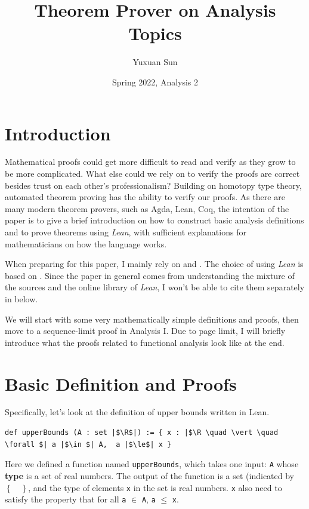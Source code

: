 \documentclass[a4paper]{article}
\title{Theorem Prover on Analysis Topics}
\date{Spring 2022, Analysis 2}
\author{Yuxuan Sun}
\newcommand{\R}{\mathbb{R}}
\theoremstyle{bfnote} %
\theoremstyle{bfnote}                  %
\theoremstyle{example}                       %
\theoremstyle{remark}                       %
\numberwithin{equation}{section}
\begin{document}
\maketitle
\tableofcontents

\section{Introduction}
Mathematical proofs could get more difficult to read and verify as they grow to be more complicated. What else could we rely on to verify the proofs are correct besides trust on each other's professionalism? Building on homotopy type theory, automated theorem proving has the ability to verify our proofs. As there are many modern theorem provers, such as Agda, Lean, Coq, the intention of the paper is to give a brief introduction on how to construct basic analysis definitions and to prove theorems using \textit{Lean}, with sufficient explanations for mathematicians on how the language works.

When preparing for this paper, I mainly rely on \cite{Avigad2016} and \cite{homotopy}. The choice of using \textit{Lean} is based on \cite{boldo}. Since the paper in general comes from understanding the mixture of the sources and the online library of \textit{Lean}, I won't be able to cite them separately in below.

We will start with some very mathematically simple definitions and proofs, then move to a sequence-limit proof in Analysis I. Due to page limit, I will briefly introduce what the proofs related to functional analysis look like at the end.

\section{Basic Definition and Proofs}

Specifically, let's look at the definition of upper bounds written in Lean.

\begin{listing}[!ht]
\begin{verbatim}
def upperBounds (A : set |$\R$|) := { x : |$\R \quad \vert \quad  \forall $| a |$\in $| A,  a |$\le$| x }
\end{verbatim}
\end{listing}

Here we defined a function named \texttt{upperBounds}, which takes one input: \texttt{A} whose \textbf{type} is a set of real numbers. The output of the function is a set (indicated by $\left\{ \quad \right\} $, and the type of elements \texttt{x} in the set is real numbers.  \texttt{x}  also need to satisfy the property that for all \texttt{a} $\in $ \texttt{A}, \texttt{a} $\le $ \texttt{x}.
\end{document}
